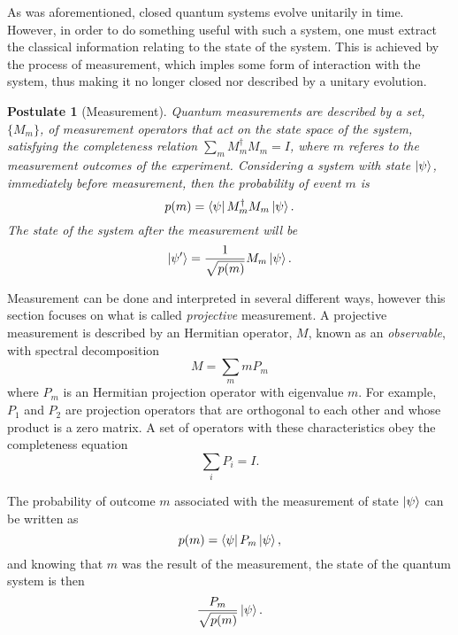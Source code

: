 \documentclass[../../dissertation.tex]{subfiles}
\newtheorem{post}{Postulate}
\begin{document}
As was aforementioned, closed quantum systems evolve unitarily in time.
However, in order to do something useful with such a system, one must extract
the classical information relating to the state of the system. This is achieved
by the process of measurement, which imples some form of interaction with the
system, thus making it no longer closed nor described by a unitary evolution.
\begin{post}[Measurement]
Quantum measurements are described by a set, $\{M_m\}$, of measurement operators
that act on the state space of the system, satisfying the completeness relation
$\sum_m M_m^\dag M_m = I$, where $m$ referes to the measurement outcomes of the
experiment. Considering a system with state $\ket{\psi}$, immediately before
measurement, then the probability of event $m$ is \begin{equation}
	p(m) = \bra{\psi} M_m^\dag M_m \ket{\psi}.
\end{equation}
The state of the system after the measurement will be
\begin{equation}
\ket{\psi'} = \frac{1}{\sqrt{p(m)}} M_m \ket{\psi}.
\end{equation}
\end{post}\par
Measurement can be done and interpreted in several different ways, however this
section focuses on what is called \textit{projective} measurement. A projective
measurement is described by an Hermitian operator, $M$, known as an
\textit{observable}, with spectral decomposition
\begin{equation}
	M = \sum_m m P_m
\end{equation}
where $P_m$ is an Hermitian projection operator with eigenvalue $m$. For
example, $P_1$ and $P_2$ are projection operators that are orthogonal to each
other and whose product is a zero matrix. A set of operators with these
characteristics obey the completeness equation 
\begin{equation}
	\sum_i P_i = I.
\end{equation}\par
The probability of outcome $m$ associated with the measurement of state
$\ket{\psi}$ can be written as 
\begin{equation}
	p(m) = \bra{\psi} P_m \ket{\psi},
\end{equation}
and knowing that $m$ was the result of the measurement, the state of the
quantum system is then
\begin{equation}
	\frac{P_m}{\sqrt{p(m)}} \ket{\psi}.
\end{equation}\par
\end{document}
